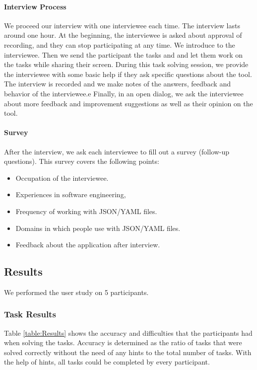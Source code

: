 
\paragraph{Interview Process}
We proceed our interview with one interviewee each time.
The interview lasts around one hour.
At the beginning, the interviewee is asked about approval of recording, and they can stop participating at any time.
We introduce \toolname{} to the interviewee. 
Then we send the participant the tasks and \cfgfile{} and let them work on the tasks while sharing their screen.
During this task solving session, we provide the interviewee with some basic help if they ask specific questions about the tool.
The interview is recorded and we make notes of the answers, feedback and behavior of the interviewee.e
Finally, in an open dialog, we ask the interviewee about more feedback and improvement suggestions as well as their opinion on the tool.

\paragraph{Survey}
After the interview, we ask each interviewee to fill out a survey (follow-up questions).
This survey covers the following points:
\begin{itemize}
    \item Occupation of the interviewee.
    \item Experiences in software engineering,
    \item Frequency of working with JSON/YAML files.
    \item Domains in which people use with JSON/YAML files.
    \item Feedback about the application after interview.
\end{itemize}

\subsection{Results}
We performed the user study on 5 participants.

\subsubsection{Task Results}
Table \ref{table:Results} shows the accuracy and difficulties that the participants had when solving the tasks.
Accuracy is determined as the ratio of tasks that were solved correctly without the need of any hints to the total number of tasks.
With the help of hints, all tasks could be completed by every participant.

